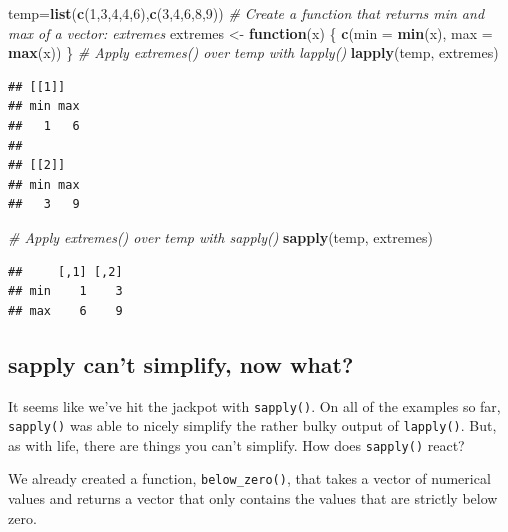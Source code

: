 \documentclass[
]{book}
\newenvironment{Shaded}{\begin{snugshade}}{\end{snugshade}}
\newcommand{\CommentTok}[1]{\textcolor[rgb]{0.56,0.35,0.01}{\textit{#1}}}
\newcommand{\ControlFlowTok}[1]{\textcolor[rgb]{0.13,0.29,0.53}{\textbf{#1}}}
\newcommand{\DataTypeTok}[1]{\textcolor[rgb]{0.13,0.29,0.53}{#1}}
\newcommand{\DecValTok}[1]{\textcolor[rgb]{0.00,0.00,0.81}{#1}}
\newcommand{\KeywordTok}[1]{\textcolor[rgb]{0.13,0.29,0.53}{\textbf{#1}}}
\newcommand{\NormalTok}[1]{#1}
\newcommand{\StringTok}[1]{\textcolor[rgb]{0.31,0.60,0.02}{#1}}
\begin{document}
\begin{Shaded}
\begin{Highlighting}[]
\NormalTok{temp=}\KeywordTok{list}\NormalTok{(}\KeywordTok{c}\NormalTok{(}\DecValTok{1}\NormalTok{,}\DecValTok{3}\NormalTok{,}\DecValTok{4}\NormalTok{,}\DecValTok{4}\NormalTok{,}\DecValTok{6}\NormalTok{),}\KeywordTok{c}\NormalTok{(}\DecValTok{3}\NormalTok{,}\DecValTok{4}\NormalTok{,}\DecValTok{6}\NormalTok{,}\DecValTok{8}\NormalTok{,}\DecValTok{9}\NormalTok{))}
\CommentTok{# Create a function that returns min and max of a vector: extremes}
\NormalTok{extremes <-}\StringTok{ }\ControlFlowTok{function}\NormalTok{(x) \{}
  \KeywordTok{c}\NormalTok{(}\DataTypeTok{min =} \KeywordTok{min}\NormalTok{(x), }\DataTypeTok{max =} \KeywordTok{max}\NormalTok{(x))}
\NormalTok{\}}
\CommentTok{# Apply extremes() over temp with lapply()}
\KeywordTok{lapply}\NormalTok{(temp, extremes)}
\end{Highlighting}
\end{Shaded}

\begin{verbatim}
## [[1]]
## min max 
##   1   6 
## 
## [[2]]
## min max 
##   3   9
\end{verbatim}

\begin{Shaded}
\begin{Highlighting}[]
\CommentTok{# Apply extremes() over temp with sapply()}
\KeywordTok{sapply}\NormalTok{(temp, extremes)}
\end{Highlighting}
\end{Shaded}

\begin{verbatim}
##     [,1] [,2]
## min    1    3
## max    6    9
\end{verbatim}

\hypertarget{sapply-cant-simplify-now-what}{%
\subsection{sapply can't simplify, now what?}\label{sapply-cant-simplify-now-what}}

It seems like we've hit the jackpot with \texttt{sapply()}. On all of the examples so far, \texttt{sapply()} was able to nicely simplify the rather bulky output of \texttt{lapply()}. But, as with life, there are things you can't simplify. How does \texttt{sapply()} react?

We already created a function, \texttt{below\_zero()}, that takes a vector of numerical values and returns a vector that only contains the values that are strictly below zero.
\end{document}
